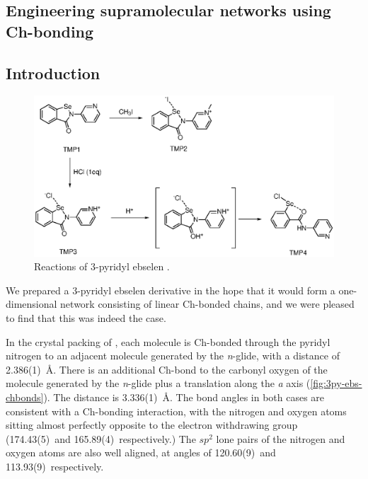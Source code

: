 \begin{refsection}

\chapter{Engineering supramolecular networks using Ch-bonding}

\section{Introduction}

\begin{figure}
    \centering
    \includegraphics[scale=0.74]{Figures/ebs-3py-scheme.eps}
    \caption{Reactions of 3-pyridyl ebselen .}
    \label{sch:selenylchloride-mechanism}
\end{figure}

We prepared a 3-pyridyl ebselen derivative  in the hope that it would form a one-dimensional network consisting of linear Ch-bonded chains, and we were pleased to find that this was indeed the case.\autocite{???}

In the crystal packing of , each molecule is Ch-bonded through the pyridyl nitrogen to an adjacent molecule generated by the \textit{n}-glide, with a  distance of 2.386(1)~\AA.
There is an additional Ch-bond to the carbonyl oxygen of the molecule generated by the \textit{n}-glide plus a translation along the \textit{a} axis (\cref{fig:3py-ebs-chbonds}).
The  distance is 3.336(1)~\AA.
The bond angles in both cases are consistent with a Ch-bonding interaction, with the nitrogen and oxygen atoms sitting almost perfectly opposite to the electron withdrawing group (174.43(5)\degree~and 165.89(4)\degree~respectively.)
The $sp^2$ lone pairs of the nitrogen and oxygen atoms are also well aligned, at angles of 120.60(9)\degree~and 113.93(9)\degree~respectively.


\end{refsection}
